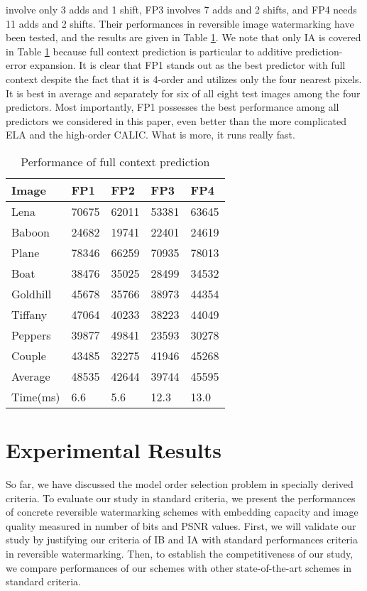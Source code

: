 \documentclass[journal]{IEEEtran}
\begin{document}
involve only 3 adds and 1 shift, FP3 involves 7 adds and 2 shifts, and FP4 needs 11 adds and 2
shifts. Their performances in reversible image watermarking have been tested, and the results are
given in Table \ref{tbl:fullpfm}. We note that only IA is covered in Table \ref{tbl:fullpfm} because
full context prediction is particular to additive prediction-error expansion. It is clear that FP1
stands out as the best predictor with full context despite the fact that it is 4-order and utilizes
only the four nearest pixels. It is best in average and separately for six of all eight test images
among the four predictors. Most importantly, FP1 possesses the best performance among all predictors
we considered in this paper, even better than the more complicated ELA and the high-order CALIC.
What is more, it runs really fast. 
\begin{table}[t]
    \centering
    \caption{\label{tbl:fullpfm}Performance of full context prediction}
    \begin{tabular}{lllll}\hline\hline
	Image & FP1 & FP2 & FP3 & FP4 \\\hline
	Lena	& 70675 & 62011 & 53381 & 63645 \\
	Baboon	& 24682 & 19741 & 22401 & 24619 \\
	Plane	& 78346 & 66259 & 70935 & 78013 \\
	Boat	& 38476 & 35025 & 28499 & 34532 \\
	Goldhill& 45678 & 35766 & 38973 & 44354 \\
	Tiffany	& 47064 & 40233 & 38223 & 44049 \\
	Peppers	& 39877 & 49841 & 23593 & 30278 \\
	Couple	& 43485 & 32275 & 41946 & 45268 \\
	Average	& 48535 & 42644 & 39744 & 45595 \\
	Time(ms)& 6.6	& 5.6	& 12.3	& 13.0	\\\hline\hline
    \end{tabular}
\end{table}
\section{Experimental Results}\label{sec:result}
So far, we have discussed the model order selection problem in specially derived criteria. To
evaluate our study in standard criteria, we present the performances of concrete reversible
watermarking schemes with embedding capacity and image quality measured in number of bits and PSNR
values. First, we will validate our study by justifying our criteria of IB and IA with standard
performances criteria in reversible watermarking. Then, to establish the competitiveness of our
study, we compare performances of our schemes with other state-of-the-art schemes in standard
criteria. 
\end{document}
